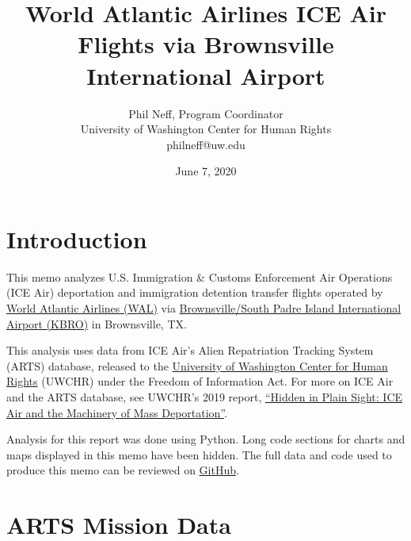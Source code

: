 \documentclass[a4paper,11pt,final]{article}
\begin{document}
\title{World Atlantic Airlines ICE Air Flights via Brownsville International Airport}\author{Phil Neff, Program Coordinator\\University of Washington Center for Human Rights\\philneff@uw.edu}\date{June 7, 2020}\maketitle

\section{Introduction}

This memo analyzes U.S. Immigration \& Customs Enforcement Air
Operations (ICE Air) deportation and immigration detention transfer
flights operated by \href{https://www.flywaa.com/\#tf-home}{World
Atlantic Airlines (WAL)} via
\href{https://www.airnav.com/airport/KBRO}{Brownsville/South Padre
Island International Airport (KBRO)} in Brownsville, TX.

This analysis uses data from ICE Air's Alien Repatriation Tracking
System (ARTS) database, released to the
\href{https://jsis.washington.edu/humanrights/}{University of Washington
Center for Human Rights} (UWCHR) under the Freedom of Information Act.
For more on ICE Air and the ARTS database, see UWCHR's 2019 report,
\href{https://jsis.washington.edu/humanrights/2019/04/23/ice-air/}{``Hidden
in Plain Sight: ICE Air and the Machinery of Mass Deportation''}.

Analysis for this report was done using Python. Long code sections for
charts and maps displayed in this memo have been hidden. The full data
and code used to produce this memo can be reviewed on
\href{https://github.com/UWCHR/ice-air/tree/master/installment2/write/src}{GitHub}.

\section{ARTS Mission Data}
\end{document}
